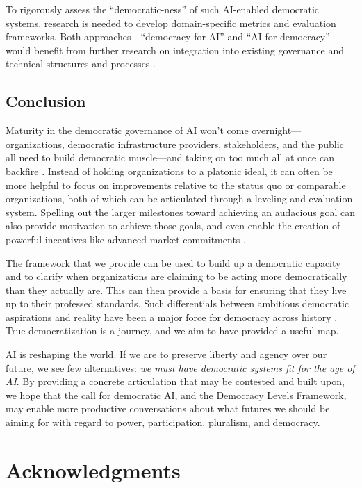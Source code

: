 \documentclass{article}
\begin{document}
    To rigorously assess the ``democratic-ness'' of such AI-enabled democratic systems, research is needed to develop domain-specific metrics and evaluation frameworks. 
    Both approaches---``democracy for AI'' and ``AI for democracy''---would benefit from further research on integration into existing governance and technical structures and processes \cite{reuel2024open}. 

\subsection{Conclusion}
    Maturity in the democratic governance of AI won't come overnight---organizations, democratic infrastructure providers, stakeholders, and the public all need to build democratic muscle---and taking on too much all at once can backfire \cite{Smith_2009}. Instead of holding organizations to a platonic ideal, it can often be more helpful to focus on improvements relative to the status quo or comparable organizations, both of which can be articulated through a leveling and evaluation system. Spelling out the larger milestones toward achieving an audacious goal can also provide motivation to achieve those goals, and even enable the creation of powerful incentives like advanced market commitments \cite{kremer2020advance}. 

    The framework that we provide can be used to build up a democratic capacity and to clarify when organizations are claiming to be acting more democratically than they actually are. This can then provide a basis for ensuring that they live up to their professed standards. Such differentials between ambitious democratic aspirations and reality have been a major force for democracy across history \cite{dahl1989democracy}. True democratization is a journey, and we aim to have provided a useful map.

    AI is reshaping the world. If we are to preserve liberty and agency over our future, we see few alternatives: \textit{we must have democratic systems fit for the age of AI}. By providing a concrete articulation that may be contested and built upon, we hope that the call for democratic AI, and the Democracy Levels Framework, may enable more productive conversations about what futures we should be aiming for with regard to power, participation, pluralism, and democracy.      

\clearpage
\section*{Acknowledgments}
\end{document}
